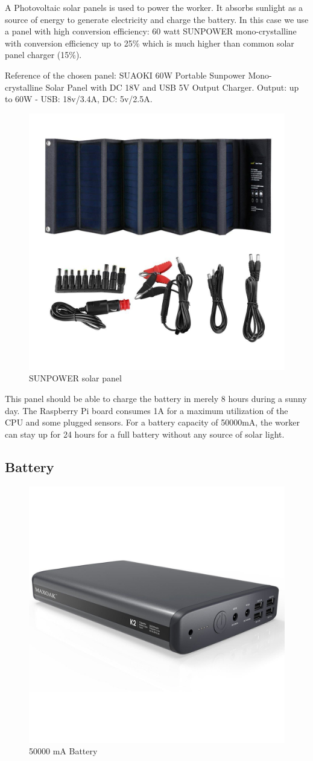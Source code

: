         A Photovoltaic solar panels is used to power the worker. It absorbs sunlight as a source of energy to
        generate electricity and charge the battery. In this case we use a panel with high conversion
        efficiency: 60 watt SUNPOWER mono-crystalline with conversion efficiency up to 25\% which is much
        higher than common solar panel charger (15\%).

        Reference of the chosen panel: SUAOKI 60W Portable Sunpower Mono-crystalline Solar Panel with DC 18V and USB
        5V Output Charger.\newline
        Output: up to 60W - USB: 18v/3.4A, DC: 5v/2.5A.

        \begin{figure}[!h]\centering
            \includegraphics[width=.4\columnwidth]{5-Design/figs/panel.jpg}
            \caption{SUNPOWER solar panel}
        \end{figure}

        This panel should be able to charge the battery in merely 8 hours during a sunny day. The Raspberry
        Pi board consumes 1A for a maximum utilization of the CPU and some plugged sensors. For a battery
        capacity of 50000mA, the worker can stay up for 24 hours for a full battery without any source of
        solar light.

    \subsection{Battery}

        \begin{figure}[!h]\centering
            \includegraphics[width=.3\columnwidth]{5-Design/figs/battery.jpg}
            \caption{50000 mA Battery}
        \end{figure}


